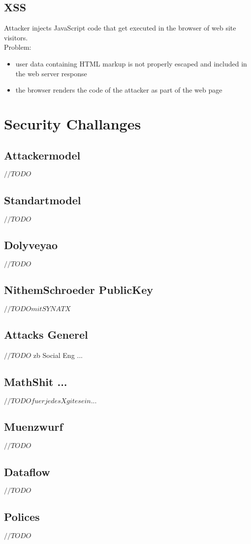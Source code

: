\documentclass[a4paper, 12pt]{article}
\begin{document}
\subsection{XSS}
Attacker injects JavaScript code that get executed in the browser of web site visitors.\\

Problem:
\begin{itemize}
\item user data containing HTML markup is not properly escaped and included in the web server response
\item the browser renders the code of the attacker as part of the web page
\end{itemize}

\section{Security Challanges}
\subsection{Attackermodel}
$ //TODO $
\subsection{Standartmodel}
$ //TODO $
\subsection{Dolyveyao}
$ //TODO $
\subsection{NithemSchroeder PublicKey}
$ //TODO mit SYNATX $
\subsection{Attacks Generel}
$ //TODO $
zb Social Eng ...
\subsection{MathShit ...}
$ //TODO fuer jedes X git es ein ... $
\subsection{Muenzwurf}
$ //TODO $
\subsection{Dataflow}
$ //TODO $
\subsection{Polices}
$ //TODO $
\end{document}
